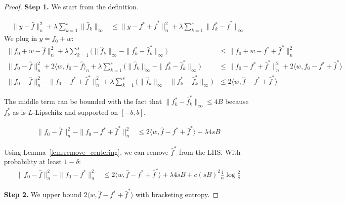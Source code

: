 \begin{proof}

\textbf{Step 1.} We start from the definition. 

\begin{align*}
\| y - \hat{f} \|_n^2 + \lambda \sum_{k=1}^s \| \hat{f}_k \|_\infty &\leq
  \| y - f^* + \bar{f}^* \|_n^2 + \lambda \sum_{k=1}^s \| f^*_k - \bar{f}^* \|_\infty 
\end{align*}
We plug in $y = f_0 + w$:
\begin{align*}
\| f_0 + w - \hat{f} \|_n^2 + \lambda \sum_{k=1}^s \Big( \| \hat{f}_k \|_\infty - 
    \| f^*_k - \bar{f}^*_k \|_\infty \Big) &\leq \|f_0 + w - f^* + \bar{f}^* \|_n^2 \\
\| f_0 - \hat{f} \|_n^2 + 2\langle w, f_0 - \hat{f} \rangle_n 
     +\lambda \sum_{k=1}^s \Big( \| \hat{f}_k \|_\infty - \|f^*_k -\bar{f}^*_k\|_\infty \Big) 
    &\leq \| f_0 - f^* + \bar{f}^* \|_n^2 + 
    2 \langle w, f_0 - f^* + \bar{f}^* \rangle \\
\|f_0 - \hat{f} \|_n^2 - \| f_0 - f^* + \bar{f}^* \|_n^2 + 
    \lambda \sum_{k=1}^s \Big( \| \hat{f}_k \|_\infty - 
 \| f^*_k - \bar{f}^*_k \|_\infty \Big) &\leq 2 \langle w, \hat{f} - f^* + \bar{f}^* \rangle
\end{align*}

The middle term can be bounded with the fact that $\|f^*_k - \bar{f}^*_k \|_\infty \leq 4B$ because $f^*_k$ as is $L$-Lipschitz and supported on $[-b, b]$. 

\begin{align*}
\|f_0 - \hat{f} \|_n^2 - \| f_0 - f^* + \bar{f}^* \|_n^2 
   &\leq 2 \langle w, \hat{f} - f^* + \bar{f}^* \rangle + \lambda 4 s B 
\end{align*}

Using Lemma~\ref{lem:remove_centering}, we can remove $\bar{f}^*$ from the LHS. With probability at least $1 - \delta$:
\begin{align}
\label{eqn:first_step_inequality}
\|f_0 - \hat{f} \|_n^2 - \| f_0 - f^* \|_n^2 
   &\leq 2 \langle w, \hat{f} - f^* + \bar{f}^* \rangle + \lambda 4 s B + c(sB)^2 \frac{1}{n} \log \frac{2}{\delta}
\end{align}



\textbf{Step 2.} We upper bound $2 \langle w, \hat{f} - f^* + \bar{f}^* \rangle$ with bracketing entropy.


\end{proof}

